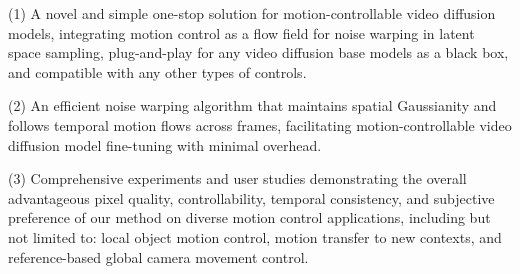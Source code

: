 (1) A novel and simple one-stop solution for motion-controllable video diffusion models, integrating motion control as a flow field for noise warping in latent space sampling, plug-and-play for any video diffusion base models as a black box, and compatible with any other types of controls.

(2) An efficient noise warping algorithm that maintains spatial Gaussianity and follows temporal motion flows across frames, facilitating motion-controllable video diffusion model fine-tuning with minimal overhead.

(3) Comprehensive experiments and user studies demonstrating the overall advantageous pixel quality, controllability, temporal consistency, and subjective preference of our method on diverse motion control applications, including but not limited to: local object motion control, motion transfer to new contexts, and reference-based global camera movement control.
